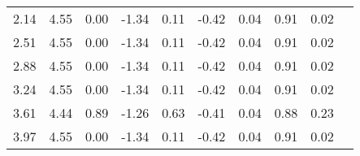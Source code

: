 \begin{tabular}{rrrrrrrrrr}
 2.14 &     4.55 &     0.00  &    -1.34 &      0.11 &     -0.42 &      0.04 &      0.91 &      0.02 \\ 
 2.51 &     4.55 &     0.00  &    -1.34 &      0.11 &     -0.42 &      0.04 &      0.91 &      0.02 \\ 
 2.88 &     4.55 &     0.00  &    -1.34 &      0.11 &     -0.42 &      0.04 &      0.91 &      0.02 \\ 
 3.24 &     4.55 &     0.00  &    -1.34 &      0.11 &     -0.42 &      0.04 &      0.91 &      0.02 \\ 
 3.61 &     4.44 &     0.89  &    -1.26 &      0.63 &     -0.41 &      0.04 &      0.88 &      0.23 \\ 
 3.97 &     4.55 &     0.00  &    -1.34 &      0.11 &     -0.42 &      0.04 &      0.91 &      0.02 \\ \hline 
\end{tabular}
